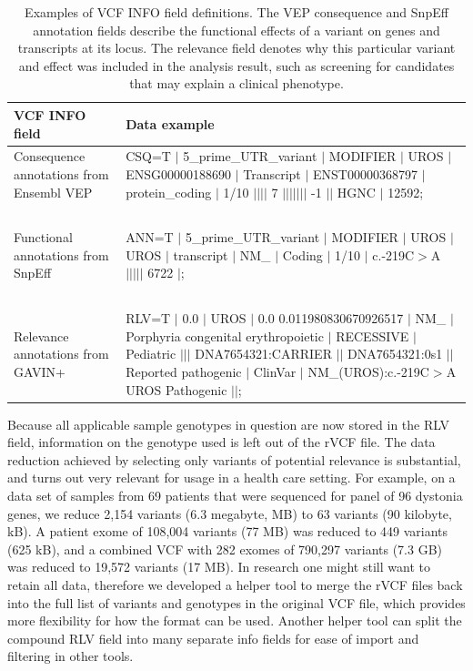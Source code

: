 \begin{table}
\begin{tabulary}{\linewidth}{LL}
  VCF INFO field & Data example \\
  \hline
  Consequence annotations from Ensembl VEP & CSQ=T $|$ 5\_\-prime\_\-UTR\_\-variant $|$ MODIFIER $|$ UROS $|$ ENSG00000188690 $|$ Transcript $|$ ENST00000368797 $|$ protein\_\-coding $|$ 1/10 $| | | |$ 7 $| | | | | | |$ -1 $| |$ HGNC $|$ 12592; \\
  ~ & ~ \\
  Functional annotations from SnpEff & ANN=T $|$ 5\_\-prime\_\-UTR\_\-variant $|$ MODIFIER $|$ UROS $|$ UROS $|$ transcript $|$ NM\_ $|$ Coding $|$ 1/10 $|$ c.-219C$>$A $| | | | |$ 6722 $|$; \\
  ~ & ~ \\
  Relevance annotations from GAVIN+ & RLV=T $|$ 0.0 $|$ UROS $|$ 0.0 0.011980830670926517 $|$ NM\_ $|$ Porphyria congenital erythropoietic $|$ RECESSIVE $|$ Pediatric $| | |$ DNA7654321:CARRIER $| |$ DNA7654321:0s1 $| |$ Reported pathogenic $|$ ClinVar $|$ NM\_(UROS):c.-219C$>$A UROS Pathogenic $| |$; \\
  \hline
\end{tabulary}
\caption[Examples of VCF INFO field definitions]{Examples of VCF INFO field definitions. The VEP consequence and SnpEff annotation fields describe the functional effects of a variant on genes and transcripts at its locus. The relevance field denotes why this particular variant and effect was included in the analysis result, such as screening for candidates that may explain a clinical phenotype.}
\label{table:frameworkforgenomics_rvcfdata}
\end{table}

Because all applicable sample genotypes in question are now stored in the RLV field,  information on the genotype used is left out of the rVCF file.
The data reduction achieved by selecting only variants of potential relevance is substantial, and turns out very relevant for usage in a health care setting.
For example, on a data set of samples from 69 patients that were sequenced for panel of 96 dystonia genes, we reduce 2,154 variants (6.3 megabyte, MB) to 63 variants (90 kilobyte, kB).
A patient exome of 108,004 variants (77 MB) was reduced to 449 variants (625 kB), and a combined VCF with 282 exomes of 790,297 variants (7.3 GB) was reduced to 19,572 variants (17 MB).
In research one might still want to retain all data, therefore we developed a helper tool to merge the rVCF files back into the full list of variants and genotypes in the original VCF file, which provides more flexibility for how the format can be used.
Another helper tool can split the compound RLV field into many separate info fields for ease of import and filtering in other tools.

